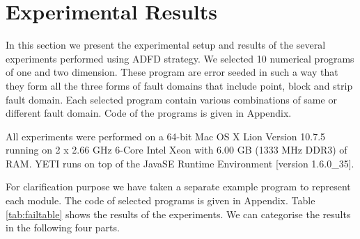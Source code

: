 \documentclass[runningheads,a4paper]{llncs}
\begin{document}

\section{Experimental Results} \label{sec:experimentalResults}
In this section we present the experimental setup and results of the several experiments performed using ADFD strategy. We selected 10 numerical programs of one and two dimension. These program are error seeded in such a way that they form all the three forms of fault domains that include point, block and strip fault domain. Each selected program contain various combinations of same or different fault domain. Code of the programs is given in Appendix. 

All experiments were performed on a 64-bit Mac OS X Lion Version 10.7.5 running on 2 x 2.66 GHz 6-Core Intel Xeon with 6.00 GB (1333 MHz DDR3) of RAM. YETI runs on top of the Java\texttrademark  SE Runtime Environment [version 1.6.0\_35]. 

For clarification purpose we have taken a separate example program to represent each module. The code of selected programs is given in Appendix. Table \ref{tab:failtable} shows the results of the experiments. We can categorise the results in the following four parts.\\


\end{document}
